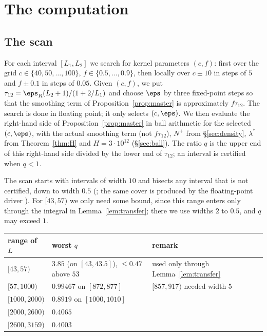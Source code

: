 \section{The computation}\label{sec:computation}

\subsection{The scan}
For each interval $[L_1, L_2]$ we search for kernel parameters $(c, f)$:
first over the grid $c\in\{40,50,\dots,100\}$, $f\in\{0.5,\dots,0.9\}$, then locally over $c\pm10$ in steps of $5$ and $f\pm0.1$ in steps of $0.05$.
Given $(c,f)$, we put $\tau_{12} = \eps_R(L_2+1)/(1 + 2/L_1)$ and choose $\eps$ by three fixed-point steps so that the smoothing term of Proposition~\ref{prop:master} is approximately $f\tau_{12}$.
The search is done in floating point; it only selects $(c, \eps)$.
We then evaluate the right-hand side of Proposition~\ref{prop:master} in ball arithmetic for the selected $(c,\eps)$, with the actual smoothing term (not $f\tau_{12}$), $N^+$ from \S\ref{sec:density}, $\lambda^*$ from Theorem~\ref{thm:H} and $H = 3\cdot10^{12}$ (\S\ref{sec:ball}).
The ratio $q$ is the upper end of this right-hand side divided by the lower end of $\tau_{12}$; an interval is certified when $q < 1$.

The scan starts with intervals of width $10$ and bisects any interval that is not certified, down to width $0.5$ (; the same cover is produced by the floating-point driver ).
For $[43, 57)$ we only need some bound, since this range enters only through the integral in Lemma~\ref{lem:transfer}; there we use widths $2$ to $0.5$, and $q$ may exceed $1$.

\begin{center}
\begin{tabular}{lll}
\toprule
range of $L$ & worst $q$ & remark\\
\midrule
$[43,57)$ & $3.85$ (on $[43,43.5]$), $\le 0.47$ above $53$ & used only through Lemma~\ref{lem:transfer}\\
$[57,1000)$ & $0.99467$ on $[872,877]$ & $[857,917)$ needed width $5$\\
$[1000,2000)$ & $0.8919$ on $[1000,1010]$ & \\
$[2000,2600)$ & $0.4065$ & \\
$[2600,3159)$ & $0.4003$ & \\
\bottomrule
\end{tabular}
\end{center}

